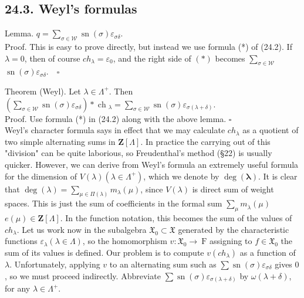 \documentclass[10pt]{article}
\begin{document}
\subsection*{24.3. Weyl's formulas}
Lemma. $q=\sum_{\sigma \in \mathscr{W}} \operatorname{sn}(\sigma) \varepsilon_{\sigma \delta}$.\\
Proof. This is easy to prove directly, but instead we use formula (*) of (24.2). If $\lambda=0$, then of course $c h_{\lambda}=\varepsilon_{0}$, and the right side of $(*)$ becomes $\sum_{\sigma \in \mathscr{W}}$ $\operatorname{sn}(\sigma) \varepsilon_{\sigma \delta} . \quad \square$

Theorem (Weyl). Let $\lambda \in \Lambda^{+}$. Then $\left(\sum_{\sigma \in \mathscr{W}} \operatorname{sn}(\sigma) \varepsilon_{\sigma \delta}\right) * \operatorname{ch}{ }_{\lambda}=\sum_{\sigma \in \mathscr{W}} \operatorname{sn}(\sigma) \varepsilon_{\sigma(\lambda+\delta)}$.\\
Proof. Use formula (*) in (24.2) along with the above lemma. $\square$\\
Weyl's character formula says in effect that we may calculate $c h_{\lambda}$ as a quotient of two simple alternating sums in $\mathbf{Z}[\Lambda]$. In practice the carrying out of this "division" can be quite laborious, so Freudenthal's method (§22) is usually quicker. However, we can derive from Weyl's formula an extremely useful formula for the dimension of $V(\lambda)\left(\lambda \in \Lambda^{+}\right)$, which we denote by $\operatorname{deg}(\boldsymbol{\lambda})$. It is clear that $\operatorname{deg}(\lambda)=\sum_{\mu \in \Pi(\lambda)} m_{\lambda}(\mu)$, since $V(\lambda)$ is direct sum of weight spaces. This is just the sum of coefficients in the formal sum $\sum_{\mu} m_{\dot{\lambda}}(\mu)$ $e(\mu) \in \mathbf{Z}[\Lambda]$. In the function notation, this becomes the sum of the values of $c h_{\lambda}$. Let us work now in the subalgebra $\mathfrak{X}_{0} \subset \mathfrak{X}$ generated by the characteristic functions $\varepsilon_{\lambda}(\lambda \in \Lambda)$, so the homomorphism $v: \mathfrak{X}_{0} \rightarrow \mathrm{~F}$ assigning to $f \in \mathfrak{X}_{0}$ the sum of its values is defined. Our problem is to compute $v\left(c h_{\lambda}\right)$ as a function of $\lambda$. Unfortunately, applying $v$ to an alternating sum such as $\sum \operatorname{sn}(\sigma) \varepsilon_{\sigma \delta}$ gives 0 , so we must proceed indirectly. Abbreviate $\sum \operatorname{sn}(\sigma) \varepsilon_{\sigma(\lambda+\delta)}$ by $\omega(\lambda+\delta)$, for any $\lambda \in \Lambda^{+}$.
\end{document}
